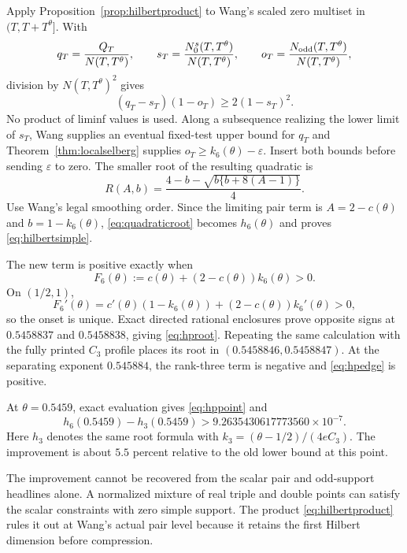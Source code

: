 ﻿\documentclass[11pt]{article}
\theoremstyle{remark}
\begin{document}
Apply Proposition~\ref{prop:hilbertproduct} to Wang's scaled zero multiset in
$(T,T+T^\theta]$. With
\[
 q_T=\frac{Q_T}{N(T,T^\theta)},\qquad
 s_T=\frac{N_0^s(T,T^\theta)}{N(T,T^\theta)},\qquad
 o_T=\frac{N_{\rm odd}(T,T^\theta)}{N(T,T^\theta)},
\]
division by $N(T,T^\theta)^2$ gives
\begin{equation}\label{eq:normalizedproduct}
 (q_T-s_T)(1-o_T)\ge2(1-s_T)^2.
\end{equation}
No product of liminf values is used. Along a subsequence realizing the lower
limit of $s_T$, Wang supplies an eventual fixed-test upper bound for $q_T$ and
Theorem~\ref{thm:localselberg} supplies
$o_T\ge k_6(\theta)-\varepsilon$. Insert both bounds before sending
$\varepsilon$ to zero. The smaller root of the resulting quadratic is
\begin{equation}\label{eq:quadraticroot}
 R(A,b)=\frac{4-b-\sqrt{b\{b+8(A-1)\}}}{4}.
\end{equation}
Use Wang's legal smoothing order. Since the limiting pair term is
$A=2-c(\theta)$ and $b=1-k_6(\theta)$, \eqref{eq:quadraticroot} becomes
$h_6(\theta)$ and proves \eqref{eq:hilbertsimple}.

The new term is positive exactly when
\begin{equation}\label{eq:hpfunction}
 F_6(\theta):=c(\theta)+(2-c(\theta))k_6(\theta)>0.
\end{equation}
On $(1/2,1)$,
\[
 F_6'(\theta)=c'(\theta)(1-k_6(\theta))+
 (2-c(\theta))k_6'(\theta)>0,
\]
so the onset is unique. Exact directed rational enclosures prove opposite
signs at $0.5458837$ and $0.5458838$, giving \eqref{eq:hproot}. Repeating the
same calculation with the fully printed $C_3$ profile places its root in
$(0.5458846,0.5458847)$. At the separating exponent $0.545884$, the
rank-three term is negative and \eqref{eq:hpedge} is positive.

At $\theta=0.5459$, exact evaluation gives \eqref{eq:hppoint} and
\[
 h_6(0.5459)-h_3(0.5459)>
 9.2635430617773560\times10^{-7}.
\]
Here $h_3$ denotes the same root formula with
$k_3=(\theta-1/2)/(4eC_3)$. The improvement is about $5.5$ percent relative
to the old lower bound at this point.

The improvement cannot be recovered from the scalar pair and odd-support
headlines alone. A normalized mixture of real triple and double points can
satisfy the scalar constraints with zero simple support. The product
\eqref{eq:hilbertproduct} rules it out at Wang's actual pair level because it
retains the first Hilbert dimension before compression.
\end{document}
